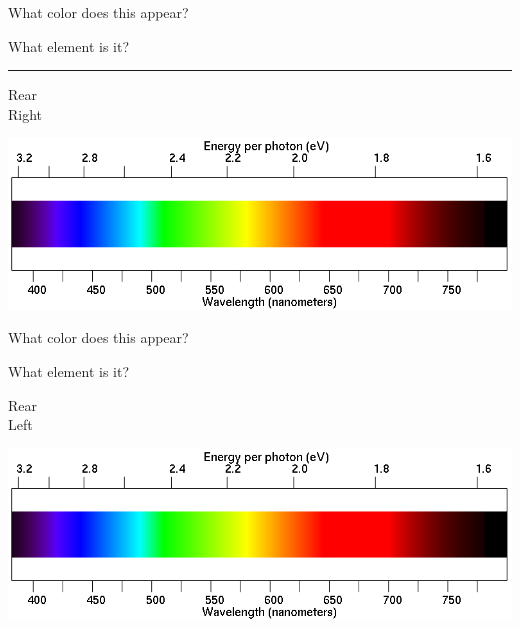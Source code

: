 \documentclass[12pt]{article}
\begin{document}
\begin{minipage}{0.5\textwidth}
What color does this appear?
\end{minipage}
\begin{minipage}{0.5\textwidth}
What element is it?
\end{minipage}

\vspace{1in}
\hrule

\begin{minipage}{0.1\textwidth}
\begin{center}
\Large Rear \\ Right
\end{center}
\end{minipage}
\begin{minipage}{0.8\textwidth}
\includegraphics[width=\textwidth]{spectrum2.png}
\end{minipage}

\begin{minipage}{0.5\textwidth}
What color does this appear?
\end{minipage}
\begin{minipage}{0.5\textwidth}
What element is it?
\end{minipage}
\newpage

\begin{minipage}{0.1\textwidth}
\begin{center}
\Large Rear \\ Left
\end{center}
\end{minipage}
\begin{minipage}{0.8\textwidth}
\includegraphics[width=\textwidth]{spectrum2.png}
\end{minipage}
\end{document}
